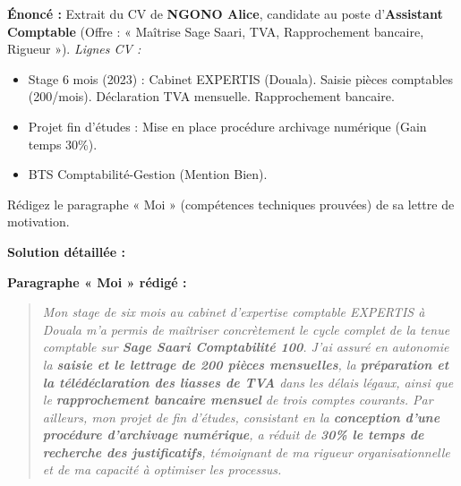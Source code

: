 \documentclass[11pt]{article}
\begin{document}
\begin{exoresolu}
\textbf{Énoncé :} Extrait du CV de \textbf{NGONO Alice}, candidate au poste d'\textbf{Assistant Comptable} (Offre : « Maîtrise Sage Saari, TVA, Rapprochement bancaire, Rigueur »).
\textit{Lignes CV :}
\begin{itemize}
\item Stage 6 mois (2023) : Cabinet EXPERTIS (Douala). Saisie pièces comptables (200/mois). Déclaration TVA mensuelle. Rapprochement bancaire.
\item Projet fin d'études : Mise en place procédure archivage numérique (Gain temps 30\%).
\item BTS Comptabilité-Gestion (Mention Bien).
\end{itemize}
Rédigez le paragraphe « Moi » (compétences techniques prouvées) de sa lettre de motivation.

\tcblower
\textbf{Solution détaillée :}

\textbf{Paragraphe « Moi » rédigé :}
\begin{quote}
\textit{Mon stage de six mois au cabinet d'expertise comptable EXPERTIS à Douala m'a permis de maîtriser concrètement le cycle complet de la tenue comptable sur \textbf{Sage Saari Comptabilité 100}. J'ai assuré en autonomie la \textbf{saisie et le lettrage de 200 pièces mensuelles}, la \textbf{préparation et la télédéclaration des liasses de TVA} dans les délais légaux, ainsi que le \textbf{rapprochement bancaire mensuel} de trois comptes courants. Par ailleurs, mon projet de fin d'études, consistant en la \textbf{conception d'une procédure d'archivage numérique}, a réduit de \textbf{30\% le temps de recherche des justificatifs}, témoignant de ma rigueur organisationnelle et de ma capacité à optimiser les processus.}
\end{quote}


\end{exoresolu}
\end{document}
